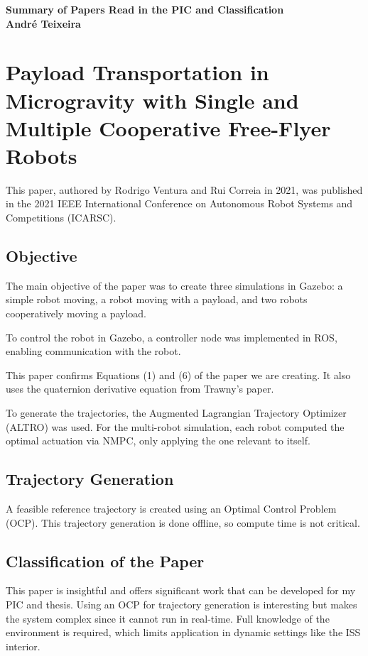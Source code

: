 \documentclass[a4paper,12pt]{article}
\begin{document}
\begin{titlepage}
	\centering
	\vspace*{1in}
	{\Huge \textbf{Summary of Papers Read in the PIC and Classification}} \\
	\vspace{1.5in}
	{\large \textbf{André Teixeira}} \\
	\vfill
\end{titlepage}

\tableofcontents

\clearpage

\section{Payload Transportation in Microgravity with Single and Multiple Cooperative Free-Flyer Robots}\label{sec:Correia_Ventura_Payload_Transportation_in_Microgravity}
This paper\cite{correia2021payload}, authored by Rodrigo Ventura and Rui
Correia in 2021, was published in the 2021 IEEE International Conference on
Autonomous Robot Systems and Competitions (ICARSC).

\subsection{Objective}
The main objective of the paper was to create three simulations in Gazebo: a
simple robot moving, a robot moving with a payload, and two robots
cooperatively moving a payload.

To control the robot in Gazebo, a controller node was implemented in ROS,
enabling communication with the robot.

This paper confirms Equations (1) and (6) of the paper we are creating. It also
uses the quaternion derivative equation from Trawny's paper.

To generate the trajectories, the Augmented Lagrangian Trajectory Optimizer
(ALTRO) was used. For the multi-robot simulation, each robot computed the
optimal actuation via NMPC, only applying the one relevant to itself.

\subsection{Trajectory Generation}
A feasible reference trajectory is created using an Optimal Control Problem
(OCP). This trajectory generation is done offline, so compute time is not
critical.

\subsection{Classification of the Paper}
This paper is insightful and offers significant work that can be developed for
my PIC and thesis. Using an OCP for trajectory generation is interesting but
makes the system complex since it cannot run in real-time. Full knowledge of
the environment is required, which limits application in dynamic settings like
the ISS interior.
\end{document}
